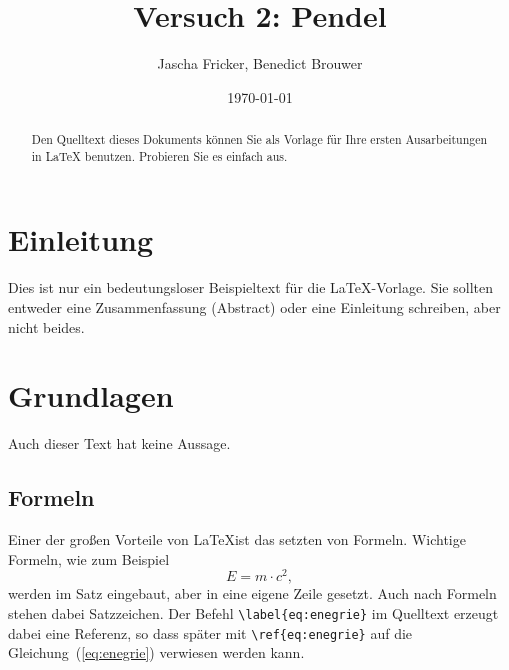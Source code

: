 \documentclass[11pt,a4paper]{article}
\begin{document}
\title{Versuch 2: Pendel}
\author{Jascha Fricker,
        Benedict Brouwer}
\date{\today}
\maketitle

\tableofcontents


\clearpage
\begin{abstract}
    Den Quelltext dieses Dokuments können Sie als Vorlage für Ihre ersten Ausarbeitungen in LaTeX benutzen. Probieren Sie es einfach aus.
\end{abstract}

\section{Einleitung}
Dies ist nur ein bedeutungsloser Beispieltext für die \LaTeX-Vorlage.
Sie sollten entweder eine Zusammenfassung (Abstract) oder eine Einleitung schreiben, aber nicht beides.
\section{Grundlagen}
Auch dieser Text hat keine Aussage.
\subsection{Formeln}
Einer der großen Vorteile von \LaTeX ist das setzten von Formeln. Wichtige Formeln, wie zum Beispiel
\begin{equation}
    E = m\cdot c^2,
    \label{eq:enegrie}
\end{equation}
werden im Satz eingebaut, aber in eine eigene Zeile gesetzt. Auch nach Formeln stehen dabei Satzzeichen. Der Befehl \verb!\label{eq:enegrie}! im Quelltext erzeugt dabei eine Referenz, so dass später mit \verb!\ref{eq:enegrie}! auf die Gleichung~(\ref{eq:enegrie}) verwiesen werden kann. %
\end{document}
